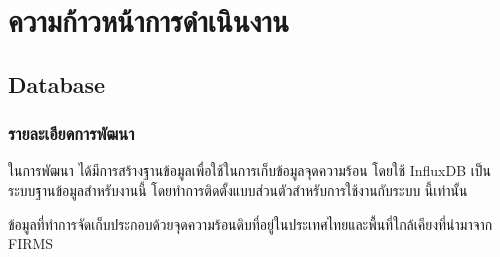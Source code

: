 \documentclass{report}
\begin{document}


%

\chapter{ความก้าวหน้าการดำเนินงาน}

\section{Database}
\subsection{รายละเอียดการพัฒนา}
ในการพัฒนา ได้มีการสร้างฐานข้อมูลเพื่อใช้ในการเก็บข้อมูลจุดความร้อน
โดยใช้ InfluxDB เป็นระบบฐานข้อมูลสำหรับงานนี้ โดยทำการติดตั้งแบบส่วนตัวสำหรับการใช้งานกับระบบ%
นี้เท่านั้น

ข้อมูลที่ทำการจัดเก็บประกอบด้วยจุดความร้อนดิบที่อยู่ในประเทศไทยและพื้นที่ใกล้เคียงที่นำมาจาก FIRMS
\end{document}
